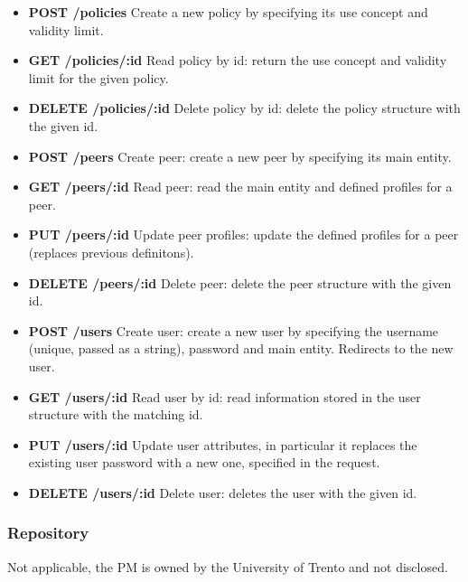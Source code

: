 \begin{itemize}
\item {\bf POST /policies} Create a new policy by specifying its use concept and validity limit.		
\item {\bf GET /policies/:id} Read policy by id: return the use concept and validity limit for the given policy.
\item {\bf DELETE /policies/:id} Delete policy by id: delete the policy structure with the given id.		
\item {\bf POST /peers}	Create peer: create a new peer by specifying its main entity.			
\item {\bf GET /peers/:id} Read peer: read the main entity and defined profiles for a peer.
\item {\bf PUT /peers/:id} Update peer profiles: update the defined profiles for a peer (replaces previous definitons).
\item {\bf DELETE /peers/:id} Delete peer: delete the peer structure with the given id.
\item {\bf POST /users}	Create user: create a new user by specifying the username (unique, passed as a string), password and main entity. Redirects to the new user. 											
\item {\bf GET /users/:id} Read user by id: read information stored in the user structure with the matching id.											
\item {\bf PUT /users/:id} Update user attributes, in particular it replaces the existing user password with a new one, specified in the request. %
\item {\bf DELETE /users/:id} Delete user: deletes the user with the given id.
\end{itemize}
\subsubsection{Repository}
Not applicable, the PM is owned by the University of Trento and not disclosed. 